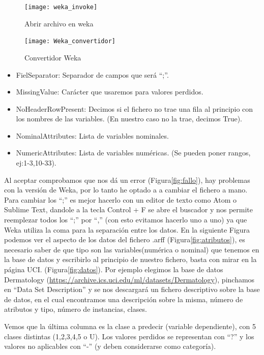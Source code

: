 \begin{figure}[H]
    \centering
    \texttt{[image: weka\_invoke]}
    \caption{Abrir archivo en weka}
    \label{fig:invoke}
\end{figure}

\begin{figure}[H]
    \centering
    \texttt{[image: Weka\_convertidor]}
    \caption{Convertidor Weka}
    \label{fig:conversor_weka}
\end{figure}

\begin{itemize}
\item FielSeparator: Separador de campos que será ``;''.
\item MissingValue: Carácter que usaremos para valores perdidos.
\item NoHeaderRowPresent: Decimos si el fichero no trae una fila al principio con los nombres de las variables. (En nuestro caso no la trae, decimos True).
\item NominalAttributes: Lista de variables nominales.
\item NumericAttributes: Lista de variables numéricas. (Se pueden poner rangos, ej:1-3,10-33).
\end{itemize}

Al aceptar comprobamos que nos dá un error (Figura\ref{fig:fallo}), hay problemas con la versión de Weka, por lo tanto he optado a a cambiar el fichero a mano. Para cambiar los ``;'' es mejor hacerlo con un editor de texto como Atom o Sublime Text, dandole a la tecla Control + F se abre el buscador y nos permite reemplezar todos los ``;'' por ``,'' (con esto evitamos hacerlo uno a uno) ya que Weka utiliza la coma para la separación entre los datos. En la siguiente Figura podemos ver el aspecto de los datos del fichero .arff (Figura\ref{fig:atributos}), es necesario saber de que tipo son las variables(numérica o nominal) que tenemos en la base de datos y escribirlo al principio de nuestro fichero, basta con mirar en la página UCI. (Figura\ref{fig:datos}). Por ejemplo elegimos la base de datos Dermatology (\url{https://archive.ics.uci.edu/ml/datasets/Dermatology}), pinchamos en ``Data Set Description'' y se nos descargará un fichero descriptivo sobre la base de datos, en el cual encontramos una descripción sobre la misma, número de atributos y tipo, número de instancias, clases. 

Vemos que la última columna es la clase a predecir (variable dependiente), con 5 clases distintas (1,2,3,4,5 o U). 
Los valores perdidos se representan con ``?'' y los valores no aplicables con ``-'' (y deben considerarse como categoría).

